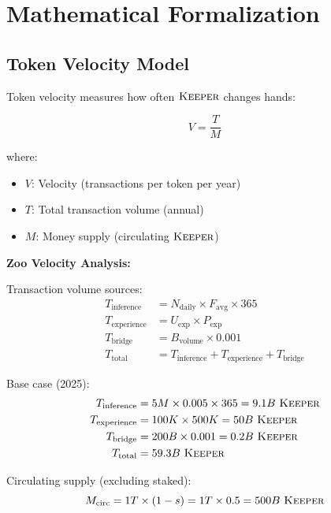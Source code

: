 \section{Mathematical Formalization}


\subsection{Token Velocity Model}

Token velocity measures how often $\textsc{Keeper}$ changes hands:

\begin{equation}
V = \frac{T}{M}
\end{equation}

where:
\begin{itemize}
\item $V$: Velocity (transactions per token per year)
\item $T$: Total transaction volume (annual)
\item $M$: Money supply (circulating $\textsc{Keeper}$)
\end{itemize}

\textbf{Zoo Velocity Analysis:}

Transaction volume sources:
\begin{align}
T_{\text{inference}} &= N_{\text{daily}} \times F_{\text{avg}} \times 365 \\
T_{\text{experience}} &= U_{\text{exp}} \times P_{\text{exp}} \\
T_{\text{bridge}} &= B_{\text{volume}} \times 0.001 \\
T_{\text{total}} &= T_{\text{inference}} + T_{\text{experience}} + T_{\text{bridge}}
\end{align}

Base case (2025):
\begin{align}
T_{\text{inference}} &= 5M \times 0.005 \times 365 = 9.1B \text{ } \textsc{Keeper} \\
T_{\text{experience}} &= 100K \times 500K = 50B \text{ } \textsc{Keeper} \\
T_{\text{bridge}} &= 200B \times 0.001 = 0.2B \text{ } \textsc{Keeper} \\
T_{\text{total}} &= 59.3B \text{ } \textsc{Keeper}
\end{align}

Circulating supply (excluding staked):
\begin{equation}
M_{\text{circ}} = 1T \times (1 - s) = 1T \times 0.5 = 500B \text{ } \textsc{Keeper}
\end{equation}

